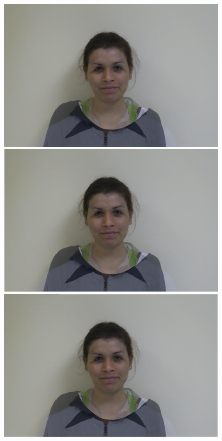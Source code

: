 \documentclass[11pt]{article}
\begin{document}
\begin{figure}[H]
\begin{center}
\includegraphics[scale=0.06]{figs/frames/morph_steinkirch_tangatur_22.jpg}  
\includegraphics[scale=0.06]{figs/frames/morph_steinkirch_tangatur_23.jpg} 
\includegraphics[scale=0.06]{figs/frames/morph_steinkirch_tangatur_24.jpg} 

\end{center}
\end{figure}
\end{document}
